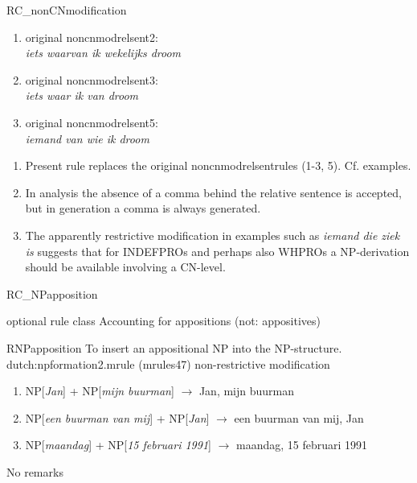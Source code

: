 \begin{mruleclass}{RC\_nonCNmodification}
\begin{members}
\begin{member}
\begin{enumerate}
  \item 
original noncnmodrelsent2:\\
{\em iets waarvan ik wekelijks droom}

  \item 
original noncnmodrelsent3:\\
{\em iets waar ik van droom}

  \item 
original noncnmodrelsent5:\\
{\em iemand van wie ik droom}
\end{enumerate}

\remarks
\begin{enumerate}
  \item 
Present rule replaces the original noncnmodrelsentrules (1-3, 5). Cf. examples.
  \item 
In analysis the absence 
of a comma behind the  relative sentence is accepted, but in generation
a comma is always generated. 
\item The apparently restrictive modification in examples such as {\em iemand 
die ziek is} suggests that for INDEFPROs and 
perhaps also WHPROs a NP-derivation 
should be available involving a CN-level. 
\end{enumerate}
\end{member}

\end{members}
\end{mruleclass}

\begin{mruleclass}{RC\_NPapposition}
\begin{classdescr}
\kind optional rule class
\classtask Accounting for appositions (not: appositives)
\classremarks
\nofilters
\nospeedrules
\noplannedrules
\norulesnotince
\begin{comments}
\end{comments}
\end{classdescr}
\begin{members}
\begin{member}
 RNPapposition
 To insert an appositional NP into the NP-structure.
\file dutch:npformation2.mrule (mrules47)
\semantics non-restrictive modification
\example 

\begin{enumerate}
\item
NP[{\em Jan}] + NP[{\em mijn buurman}] $\rightarrow$ Jan, mijn buurman
\item
NP[{\em een buurman van mij}] + NP[{\em Jan}] $\rightarrow$ 
 een buurman van mij, Jan
\item
NP[{\em maandag}] + NP[{\em 15 februari 1991}] $\rightarrow$ 
maandag, 15 februari 1991
\end{enumerate}

\remarks No remarks
\end{member}
\end{members}
\end{mruleclass}

